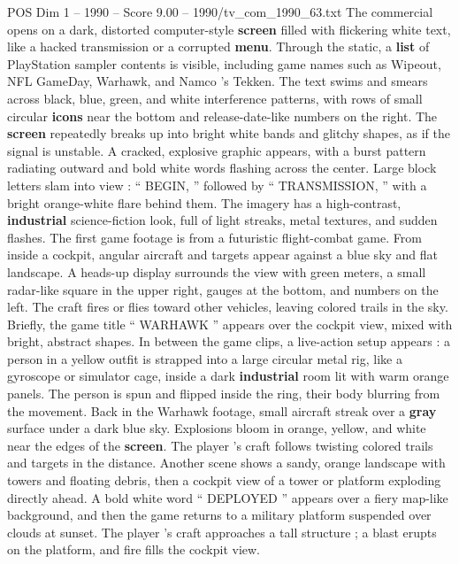 \begin{textsample}{POS Dim 1 – 1990 – Score 9.00 – 1990/tv\_com\_1990\_63.txt}  \label{ex:f1_pos_046}
The commercial opens on a dark, distorted computer-style \textbf{screen} filled with flickering white text, like a hacked transmission or a corrupted \textbf{menu}.
Through the static, a \textbf{list} of PlayStation sampler contents is visible, including game names such as Wipeout, NFL GameDay, Warhawk, and Namco ’s Tekken.
The text swims and smears across black, blue, green, and white interference patterns, with rows of small circular \textbf{icons} near the bottom and release-date-like numbers on the right.
The \textbf{screen} repeatedly breaks up into bright white bands and glitchy shapes, as if the signal is unstable.
A cracked, explosive graphic appears, with a burst pattern radiating outward and bold white words flashing across the center.
Large block letters slam into view : “ BEGIN, ” followed by “ TRANSMISSION, ” with a bright orange-white flare behind them.
The imagery has a high-contrast, \textbf{industrial} science-fiction look, full of light streaks, metal textures, and sudden flashes.
The first game footage is from a futuristic flight-combat game.
From inside a cockpit, angular aircraft and targets appear against a blue sky and flat landscape.
A heads-up display surrounds the view with green meters, a small radar-like square in the upper right, gauges at the bottom, and numbers on the left.
The craft fires or flies toward other vehicles, leaving colored trails in the sky.
Briefly, the game title “ WARHAWK ” appears over the cockpit view, mixed with bright, abstract shapes.
In between the game clips, a live-action setup appears : a person in a yellow outfit is strapped into a large circular metal rig, like a gyroscope or simulator cage, inside a dark \textbf{industrial} room lit with warm orange panels.
The person is spun and flipped inside the ring, their body blurring from the movement.
Back in the Warhawk footage, small aircraft streak over a \textbf{gray} surface under a dark blue sky.
Explosions bloom in orange, yellow, and white near the edges of the \textbf{screen}.
The player ’s craft follows twisting colored trails and targets in the distance.
Another scene shows a sandy, orange landscape with towers and floating debris, then a cockpit view of a tower or platform exploding directly ahead.
A bold white word “ DEPLOYED ” appears over a fiery map-like background, and then the game returns to a military platform suspended over clouds at sunset.
The player ’s craft approaches a tall structure ; a blast erupts on the platform, and fire fills the cockpit view.

\end{textsample}
